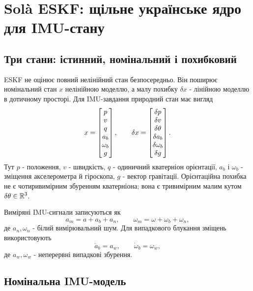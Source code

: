 \section{Solà ESKF: щільне українське ядро для IMU-стану}

\subsection{Три стани: істинний, номінальний і похибковий}

ESKF не оцінює повний нелінійний стан безпосередньо. Він поширює номінальний стан $x$ нелінійною моделлю, а малу похибку $\delta x$ - лінійною моделлю в дотичному просторі. Для IMU-завдання природний стан має вигляд
\begin{equation}
 x = \begin{bmatrix}p\\ v\\ q\\ a_b\\ \omega_b\\ g\end{bmatrix}, \qquad
 \delta x = \begin{bmatrix}\delta p\\ \delta v\\ \delta\theta\\ \delta a_b\\ \delta\omega_b\\ \delta g\end{bmatrix}.
\end{equation}
Тут $p$ - положення, $v$ - швидкість, $q$ - одиничний кватерніон орієнтації, $a_b$ і $\omega_b$ - зміщення акселерометра й гіроскопа, $g$ - вектор гравітації. Орієнтаційна похибка не є чотиривимірним збуренням кватерніона; вона є тривимірним малим кутом $\delta\theta\in\mathbb{R}^3$.

Виміряні IMU-сигнали записуються як
\begin{equation}
 a_m = a + a_b + a_n, \qquad \omega_m = \omega + \omega_b + \omega_n,
\end{equation}
де $a_n,\omega_n$ - білий вимірювальний шум. Для випадкового блукання зміщень використовують
\begin{equation}
 \dot a_b = a_w, \qquad \dot\omega_b = \omega_w,
\end{equation}
де $a_w,\omega_w$ - неперервні випадкові збурення.

\subsection{Номінальна IMU-модель}

